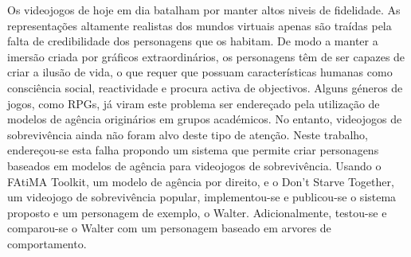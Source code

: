 \noindent Os videojogos de hoje em dia batalham por manter altos niveis de fidelidade.
As representações altamente realistas dos mundos virtuais apenas são traídas pela falta de credibilidade dos personagens que os habitam.
De modo a manter a imersão criada por gráficos extraordinários, os personagens têm de ser capazes de criar a ilusão de vida, o que requer que possuam características humanas como consciência social, reactividade e procura activa de objectivos.
Alguns géneros de jogos, como RPGs, já viram este problema ser endereçado pela utilização de modelos de agência originários em grupos académicos.
No entanto, videojogos de sobrevivência ainda não foram alvo deste tipo de atenção.
Neste trabalho, endereçou-se esta falha propondo um sistema que permite criar personagens baseados em modelos de agência para videojogos de sobrevivência.
Usando o FAtiMA Toolkit, um modelo de agência por direito, e o Don't Starve Together, um videojogo de sobrevivência popular, implementou-se e publicou-se o sistema proposto e um personagem de exemplo, o Walter.
Adicionalmente, testou-se e comparou-se o Walter com um personagem baseado em arvores de comportamento.
